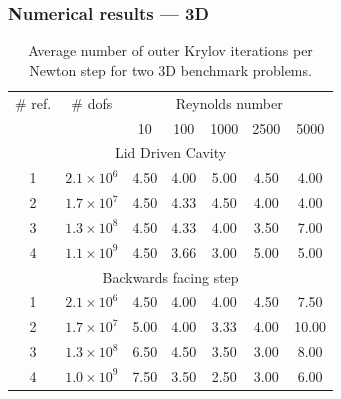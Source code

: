 \documentclass[presentation,aspectratio=43, 10pt]{beamer}
\begin{document}
\begin{frame}
  \frametitle{Numerical results --- 3D}
  \begin{table}[htbp]
    \centering
    \begin{tabular}{cc|ccccc}
      \toprule
      \# ref. & \# dofs & \multicolumn{5}{c}{Reynolds number} \\
              && 10 & 100 & 1000 & 2500 & 5000 \\
      \midrule
      \multicolumn{7}{c}{Lid Driven Cavity}\\
      \midrule
      1 & $2.1 \times 10^6$ & 4.50 & 4.00 & 5.00 & 4.50 & 4.00 \\
      2 & $1.7 \times 10^7$ & 4.50 & 4.33 & 4.50 & 4.00 & 4.00 \\
      3 & $1.3 \times 10^8$ & 4.50 & 4.33 & 4.00 & 3.50 & 7.00 \\
      4 & $1.1 \times 10^9$ & 4.50 & 3.66 & 3.00 & 5.00 & 5.00 \\
      \midrule
      \multicolumn{7}{c}{Backwards facing step}\\
      \midrule
      1 & $2.1 \times 10^6$ & 4.50 & 4.00 & 4.00 & 4.50 & 7.50  \\
      2 & $1.7 \times 10^7$ & 5.00 & 4.00 & 3.33 & 4.00 & 10.00 \\
      3 & $1.3 \times 10^8$ & 6.50 & 4.50 & 3.50 & 3.00 & 8.00  \\
      4 & $1.0 \times 10^9$ & 7.50 & 3.50 & 2.50 & 3.00 & 6.00  \\
    \end{tabular}
    \caption{Average number of outer Krylov iterations per Newton step for two 3D benchmark problems.}
    \label{tab:ourldc3d}
  \end{table}
\end{frame}
\end{document}
